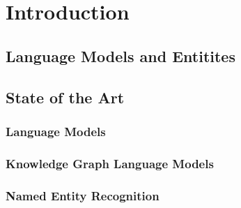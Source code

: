 \documentclass[main.tex]{subfiles}
\begin{document}
\chapter{Introduction}

\section{Language Models and Entitites}

\section{State of the Art}

\subsection{Language Models}

\subsection{Knowledge Graph Language Models}

\subsection{Named Entity Recognition}
\end{document}
